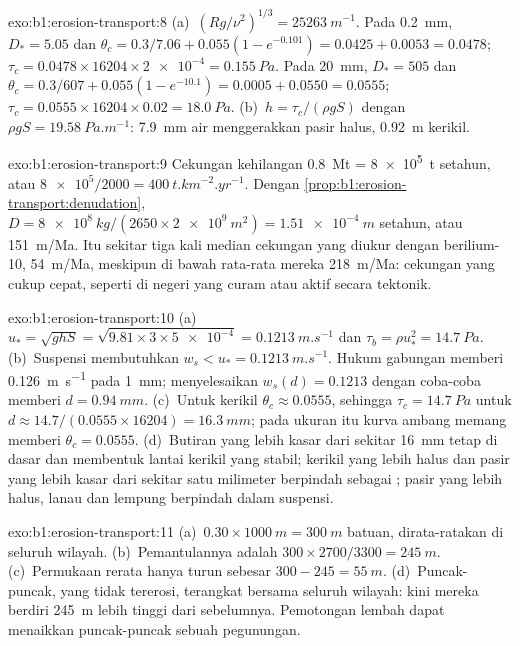 \begin{solution}{exo:b1:erosion-transport:8}
(a)~$(Rg/\nu^2)^{1/3} = \qty{25263}{m^{-1}}$. Pada \qty{0.2}{mm}, $D_* = 5.05$
dan $\theta_c = 0.3/7.06 + 0.055(1 - e^{-0.101}) = 0.0425 + 0.0053 =
0.0478$; $\tau_c = 0.0478 \times 16204 \times \num{2e-4} = \qty{0.155}{Pa}$.
Pada \qty{20}{mm}, $D_* = 505$ dan $\theta_c = 0.3/607 + 0.055(1 - e^{-10.1}) =
0.0005 + 0.0550 = 0.0555$; $\tau_c = 0.0555 \times 16204 \times 0.02 =
\qty{18.0}{Pa}$. (b)~$h = \tau_c/(\rho g S)$ dengan $\rho g S =
\qty{19.58}{Pa.m^{-1}}$: \qty{7.9}{mm} air menggerakkan pasir halus, \qty{0.92}{m}
kerikil.
\end{solution}

\begin{solution}{exo:b1:erosion-transport:9}
Cekungan kehilangan \qty{0.8}{Mt} = \qty{8e5}{t} setahun, atau $\num{8e5}/2000 =
\qty{400}{t.km^{-2}.yr^{-1}}$. Dengan \cref{prop:b1:erosion-transport:denudation},
$D = \qty{8e8}{kg}/(2650 \times \qty{2e9}{m^2}) = \qty{1.51e-4}{m}$ setahun, atau
\qty{151}{m/Ma}. Itu sekitar tiga kali median cekungan yang diukur dengan berilium-10,
\qty{54}{m/Ma}, meskipun di bawah rata-rata mereka \qty{218}{m/Ma}: cekungan yang
cukup cepat, seperti di negeri yang curam atau aktif secara tektonik.
\end{solution}

\begin{solution}{exo:b1:erosion-transport:10}
(a)~$u_* = \sqrt{g h S} = \sqrt{9.81 \times 3 \times \num{5e-4}} =
\qty{0.1213}{m.s^{-1}}$ dan $\tau_b = \rho u_*^2 = \qty{14.7}{Pa}$.
(b)~Suspensi membutuhkan $w_s < u_* = \qty{0.1213}{m.s^{-1}}$. Hukum gabungan
memberi \qty{0.126}{m.s^{-1}} pada \qty{1}{mm}; menyelesaikan
$w_s(d) = 0.1213$ dengan coba-coba memberi $d = \qty{0.94}{mm}$. (c)~Untuk kerikil
$\theta_c \approx 0.0555$, sehingga $\tau_c = \qty{14.7}{Pa}$ untuk $d \approx
14.7/(0.0555 \times 16204) = \qty{16.3}{mm}$; pada ukuran itu kurva ambang memang
memberi $\theta_c = 0.0555$. (d)~Butiran yang lebih kasar dari sekitar \qty{16}{mm}
tetap di dasar dan membentuk lantai kerikil yang stabil; kerikil yang lebih halus dan
pasir yang lebih kasar dari sekitar satu milimeter berpindah sebagai ;
pasir yang lebih halus, lanau dan lempung berpindah dalam suspensi.
\end{solution}

\begin{solution}{exo:b1:erosion-transport:11}
(a)~$0.30 \times \qty{1000}{m} = \qty{300}{m}$ batuan, dirata-ratakan di seluruh
wilayah. (b)~Pemantulannya adalah $300 \times 2700/3300 = \qty{245}{m}$. (c)~Permukaan
rerata hanya turun sebesar $300 - 245 = \qty{55}{m}$. (d)~Puncak-puncak, yang tidak
tererosi, terangkat bersama seluruh wilayah: kini mereka berdiri \qty{245}{m} lebih
tinggi dari sebelumnya. Pemotongan lembah dapat menaikkan puncak-puncak sebuah pegunungan.
\end{solution}

